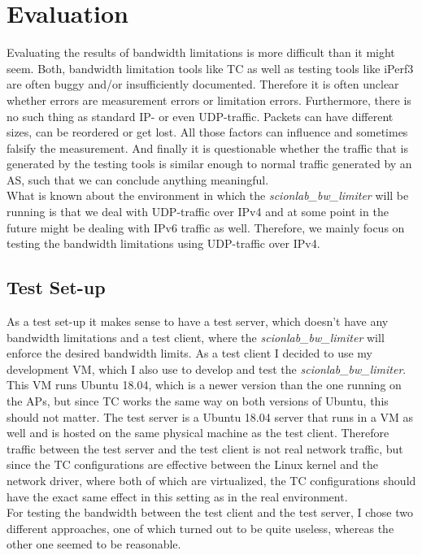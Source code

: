 \chapter{Evaluation}

Evaluating the results of bandwidth limitations is more difficult than it might seem. Both, bandwidth limitation tools like \acs{TC} as well as testing tools like iPerf3 are often buggy and/or insufficiently documented. Therefore it is often unclear whether errors are measurement errors or limitation errors. Furthermore, there is no such thing as standard \acs{IP}- or even \ac{UDP}-traffic. Packets can have different sizes, can be reordered or get lost. All those factors can influence and sometimes falsify the measurement. And finally it is questionable whether the traffic that is generated by the testing tools is similar enough to normal traffic generated by an \acs{AS}, such that we can conclude anything meaningful.
\\
What is known about the environment in which the \textit{scionlab\_bw\_limiter} will be running is that we deal with \acs{UDP}-traffic over \acs{IP}v4 and at some point in the future might be dealing with \acs{IP}v6 traffic as well. Therefore, we mainly focus on testing the bandwidth limitations using \acs{UDP}-traffic over \acs{IP}v4.

\section{Test Set-up}

As a test set-up it makes sense to have a test server, which doesn't have any bandwidth limitations and a test client, where the \textit{scionlab\_bw\_limiter} will enforce the desired bandwidth limits. As a test client I decided to use my development \acs{VM}, which I also use to develop and test the \textit{scionlab\_bw\_limiter}. This \acs{VM} runs Ubuntu 18.04, which is a newer version than the one running on the \aclp{AP}, but since \acs{TC} works the same way on both versions of Ubuntu, this should not matter. The test server is a Ubuntu 18.04 server that runs in a \acs{VM} as well and is hosted on the same physical machine as the test client. Therefore traffic between the test server and the test client is not real network traffic, but since the \acs{TC} configurations are effective between the Linux kernel and the network driver, where both of which are virtualized, the \acs{TC} configurations should have the exact same effect in this setting as in the real environment.
\\
For testing the bandwidth between the test client and the test server, I chose two different approaches, one of which turned out to be quite useless, whereas the other one seemed to be reasonable.

